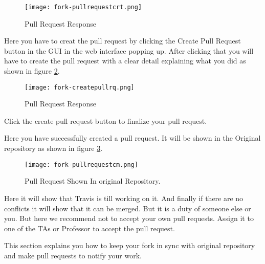 \begin{figure}[htb]\label{fig:forkpullrequestinfo}
\centering
\texttt{[image: fork-pullrequestcrt.png]}
\caption{Pull Request Response
}
\end{figure}

Here you have to creat the pull request by clicking the Create Pull
Request button in the GUI in the web interface popping up. After
clicking that you will have to create the pull request with a clear
detail explaining what you did as shown in figure
\ref{fig:forkpullrequestcr}.


\begin{figure}[htb]\label{fig:forkpullrequestcr}
\centering
\texttt{[image: fork-createpullrq.png]}
\caption{Pull Request Response
}
\end{figure}

Click the create pull request button to finalize your pull request. 

Here you have successfully created a pull request. It will be shown
in the Original repository as shown in figure \ref{fig:pullreqincm}.

\begin{figure}[htb]\label{fig:pullreqincm}
\centering
\texttt{[image: fork-pullrequestcm.png]}
\caption{Pull Request Shown In original Repository. 
}
\end{figure}

Here it will show that Travis is till working on it. And finally if
there are no conflicts it will show that it can be merged. But it is a
duty of someone else or you. But here we recommend not to accept your
own pull requests. Assign it to one of the TAs or Professor to accept
the pull request.

This section explains you how to keep your fork in sync with original
repository and make pull requests to notify your work. 
